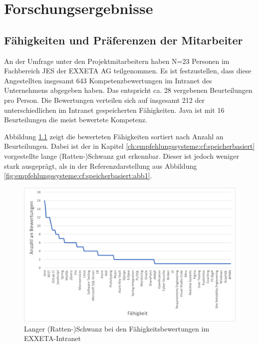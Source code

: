 \chapter{Forschungsergebnisse}
\label{ch:ergebnisse}

\section{Fähigkeiten und Präferenzen der Mitarbeiter}
\label{ch:ergebnisse:analyse}
An der Umfrage unter den Projektmitarbeitern haben N=23 Personen im Fachbereich \acl{JES} der EXXETA AG teilgenommen. Es ist festzustellen, dass diese Angestellten insgesamt 643 Kompetenzbewertungen im Intranet des Unternehmens abgegeben haben. Das entspricht ca. 28 vergebenen Beurteilungen pro Person. Die Bewertungen verteilen sich auf insgesamt 212 der \anzFaehigkeiten unterschiedlichen im Intranet gespeicherten Fähigkeiten. Java ist mit 16 Beurteilungen die meist bewertete Kompetenz.

Abbildung \ref{fig:ergebnisse:analyse:abb1} zeigt die bewerteten Fähigkeiten sortiert nach Anzahl an Beurteilungen. Dabei ist der in Kapitel \ref{ch:empfehlungssysteme:cf:speicherbasiert} vorgestellte lange (Ratten-)Schwanz gut erkennbar. Dieser ist jedoch weniger stark ausgeprägt, als in der Referenzdarstellung aus Abbildung \ref{fig:empfehlungssysteme:cf:speicherbasiert:abb1}.

\begin{figure}[h]
	\centering
	\includegraphics[width=1\textwidth]{gfx/long-tail-intranet.png}
	\caption{Langer (Ratten-)Schwanz bei den Fähigkeitsbewertungen im EXXETA-Intranet}
	\label{fig:ergebnisse:analyse:abb1}
\end{figure}

